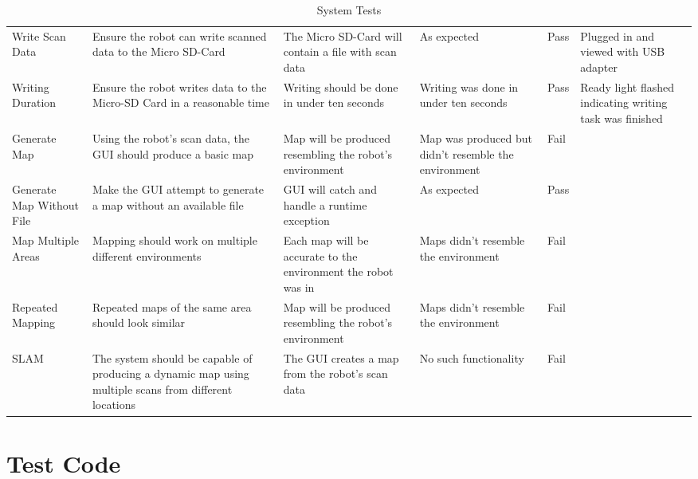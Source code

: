 \begin{landscape}
\begin{table}[h!]
\begin{tabular}{| p{2.5cm} | p{5cm} | p{4cm} | p{4cm} | p{1.5cm} | p{2cm} |}
						Write Scan Data & Ensure the robot can write scanned data to the Micro SD-Card & The Micro SD-Card will contain a file with scan data & As expected & Pass & Plugged in and viewed with USB adapter  \\
							 
						Writing Duration & Ensure the robot writes data to the Micro-SD Card in a reasonable time  & Writing should be done in under ten seconds & Writing was done in under ten seconds & Pass & Ready light flashed indicating writing task was finished  \\ 
							
						Generate Map & Using the robot's scan data, the GUI should produce a basic map & Map will be produced resembling the robot's environment & Map was produced but didn't resemble the environment & Fail &  \\ 
							
						Generate Map Without File & Make the GUI attempt to generate a map without an available file & GUI will catch and handle a runtime exception & As expected & Pass &  \\ 
							
						Map Multiple Areas & Mapping should work on multiple different environments & Each map will be accurate to the environment the robot was in & Maps didn't resemble the environment & Fail &  \\ 
							
						Repeated Mapping & Repeated maps of the same area should look similar & Map will be produced resembling the robot's environment & Maps didn't resemble the environment & Fail &  \\ 
							
						SLAM & The system should be capable of producing a dynamic map using multiple scans from different locations & The GUI creates a map from the robot's scan data & No such functionality & Fail &  \\ [1ex] 
							\hline
					\end{tabular}
				\caption{System Tests}
				\label{systemintergrationtestingtable}
				\end{table}
			\end{landscape}

		\section{Test Code}
		\label{testing:testcode}
